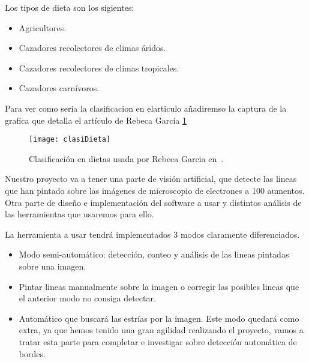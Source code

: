 Los tipos de dieta son los sigientes: 
\begin{itemize}
\item Agricultores.
\item Cazadores recolectores de climas áridos.
\item Cazadores recolectores de climas tropicales.
\item Cazadores carnívoros.
\end{itemize}
Para ver como seria la clasificacion en elarticulo añadiremso la captura de la grafica que detalla el artículo de Rebeca García \ref{fig:clasiDieta}

\begin{figure}[h]
\centering
\texttt{[image: clasiDieta]}
\caption{Clasificación en dietas usada por Rebeca Garcia en~\cite{garcia2015dietary}.}
\label{fig:clasiDieta}
\end{figure}


Nuestro proyecto va a tener una parte de visión artificial, que detecte las lineas que han pintado sobre las imágenes de microscopio de electrones a 100 aumentos. Otra parte de diseño e implementación del software a usar y distintos análisis de las herramientas que usaremos para ello.

La herramienta a usar tendrá implementados 3 modos claramente diferenciados.

\begin{itemize}
\item Modo semi-automático: detección, conteo y análisis de las lineas pintadas sobre una imagen.
\item Pintar lineas manualmente sobre la imagen o corregir las posibles lineas que el anterior modo no consiga detectar.
\item Automático que buscará las estrías por la imagen. Este modo quedará como extra, ya que hemos tenido una gran agilidad realizando el proyecto, vamos a tratar esta parte para completar e investigar sobre detección automática de bordes.
\end{itemize}








 